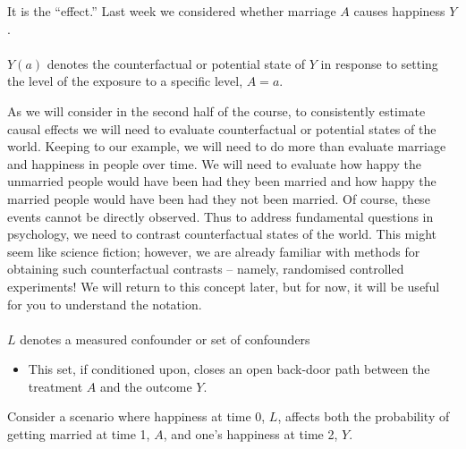 \documentclass[
  single column]{article}
\makeatletter
\let\oldparagraph\paragraph
\renewcommand{\paragraph}{
    \@ifstar
      \xxxParagraphStar
      \xxxParagraphNoStar
  }
\newcommand{\xxxParagraphStar}[1]{\oldparagraph*{#1}\mbox{}}
\newcommand{\xxxParagraphNoStar}[1]{\oldparagraph{#1}\mbox{}}
\providecommand{\tightlist}{%
  \setlength{\itemsep}{0pt}\setlength{\parskip}{0pt}}\usepackage{longtable,booktabs,array}
\makeatother
\begin{document}
It is the ``effect.'' Last week we considered whether marriage \(A\)
causes happiness \(Y\).

\paragraph{\texorpdfstring{\(Y(a)\) denotes the counterfactual or
potential state of \(Y\) in response to setting the level of the
exposure to a specific level,
\(A=a\).}{Y(a) denotes the counterfactual or potential state of Y in response to setting the level of the exposure to a specific level, A=a.}}\label{ya-denotes-the-counterfactual-or-potential-state-of-y-in-response-to-setting-the-level-of-the-exposure-to-a-specific-level-aa.}

As we will consider in the second half of the course, to consistently
estimate causal effects we will need to evaluate counterfactual or
potential states of the world. Keeping to our example, we will need to
do more than evaluate marriage and happiness in people over time. We
will need to evaluate how happy the unmarried people would have been had
they been married and how happy the married people would have been had
they not been married. Of course, these events cannot be directly
observed. Thus to address fundamental questions in psychology, we need
to contrast counterfactual states of the world. This might seem like
science fiction; however, we are already familiar with methods for
obtaining such counterfactual contrasts -- namely, randomised controlled
experiments! We will return to this concept later, but for now, it will
be useful for you to understand the notation.

\paragraph{\texorpdfstring{\(L\) denotes a measured confounder or set of
confounders}{L denotes a measured confounder or set of confounders}}\label{l-denotes-a-measured-confounder-or-set-of-confounders}

\begin{itemize}
\tightlist
\item
  This set, if conditioned upon, closes an open back-door path between
  the treatment \(A\) and the outcome \(Y\).
\end{itemize}

Consider a scenario where happiness at time 0, \(L\), affects both the
probability of getting married at time 1, \(A\), and one's happiness at
time 2, \(Y\).
\end{document}
